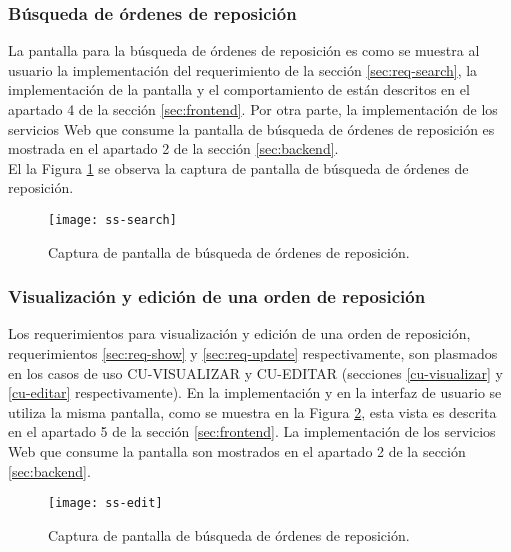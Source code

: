 \subsubsection{Búsqueda de órdenes de reposición}
La pantalla para la búsqueda de órdenes de reposición es como se muestra al usuario la implementación del requerimiento de la sección \ref{sec:req-search}, la implementación de la pantalla y el comportamiento de están descritos en el apartado 4 de la sección \ref{sec:frontend}. Por otra parte, la implementación de los servicios Web que consume la pantalla de búsqueda de órdenes de reposición es mostrada en el apartado 2 de la sección \ref{sec:backend}.\\
El la Figura \ref{fig:ss-search} se observa la captura de pantalla de búsqueda de órdenes de reposición.
\begin{figure}[h]
	\centering
	\texttt{[image: ss-search]}
	\caption{Captura de pantalla de búsqueda de órdenes de reposición.}
	\label{fig:ss-search}
\end{figure}

\subsubsection{Visualización y edición de una orden de reposición}
Los requerimientos para visualización y edición de una orden de reposición, requerimientos \ref{sec:req-show} y \ref{sec:req-update} respectivamente, son plasmados en los casos de uso CU-VISUALIZAR y CU-EDITAR (secciones \ref{cu-visualizar} y \ref{cu-editar} respectivamente). En la implementación y en la interfaz de usuario se utiliza la misma pantalla, como se muestra en la Figura \ref{fig:ss-edit}, esta vista es descrita en el apartado 5 de la sección \ref{sec:frontend}. La implementación de los servicios Web que consume la pantalla son mostrados en el apartado 2 de la sección \ref{sec:backend}.
\begin{figure}[h]
	\centering
	\texttt{[image: ss-edit]}
	\caption{Captura de pantalla de búsqueda de órdenes de reposición.}
	\label{fig:ss-edit}
\end{figure}

